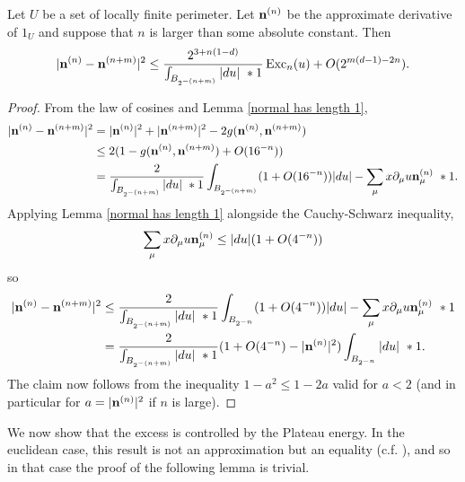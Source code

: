 \begin{lemma} \label{excess bounds Cauchy sequence}
Let $U$ be a set of locally finite perimeter.
Let $\mathbf n^{(n)}$ be the approximate derivative of $1_U$ and suppose that $n$ is larger than some absolute constant. Then
$$|\mathbf n^{(n)} - \mathbf n^{(n + m)}|^2 \leq \frac{2^{3 + n(1 - d)}}{\int_{B_{2^{-(n + m)}}} |du| ~*1} \operatorname{Exc}_n(u) + O(2^{m(d - 1) - 2n}).$$
\end{lemma}
\begin{proof}
From the law of cosines and Lemma \ref{normal has length 1},
\begin{align*}
|\mathbf n^{(n)} - \mathbf n^{(n + m)}|^2 &= |\mathbf n^{(n)}|^2 + |\mathbf n^{(n + m)}|^2 - 2 g(\mathbf n^{(n)}, \mathbf n^{(n + m)})\\
&\leq 2(1 - g(\mathbf n^{(n)}, \mathbf n^{(n + m)}) + O(16^{-n})) \\
&= \frac{2}{\int_{B_{2^{-(n + m)}}} |du| ~*1} \int_{B_{2^{-(n + m)}}} (1 + O(16^{-n}))|du| - \sum_\mu x \partial_\mu u \mathbf n_\mu^{(n)} ~*1.
\end{align*}
Applying Lemma \ref{normal has length 1} alongside the Cauchy-Schwarz inequality,
$$\sum_\mu x \partial_\mu u \mathbf n_\mu^{(n)} \leq |du|(1 + O(4^{-n}))$$
so
\begin{align*}
|\mathbf n^{(n)} - \mathbf n^{(n + m)}|^2 &\leq \frac{2}{\int_{B_{2^{-(n + m)}}} |du| ~*1} \int_{B_{2^{-n}}} (1 + O(4^{-n}))|du| - \sum_\mu x \partial_\mu u \mathbf n_\mu^{(n)} ~*1\\
&= \frac{2}{\int_{B_{2^{-(n + m)}}} |du| ~*1} (1 + O(4^{-n}) - |\mathbf n^{(n)}|^2) \int_{B_{2^{-n}}} |du| ~*1.
\end{align*}
The claim now follows from the inequality $1 - a^2 \leq 1 - 2a$ valid for $a < 2$ (and in particular for $a = |\mathbf n^{(n)}|^2$ if $n$ is large).
\end{proof}

We now show that the excess is controlled by the Plateau energy.
In the euclidean case, this result is not an approximation but an equality (c.f. \cite[pg83]{Giusti77}), and so in that case the proof of the following lemma is trivial.

